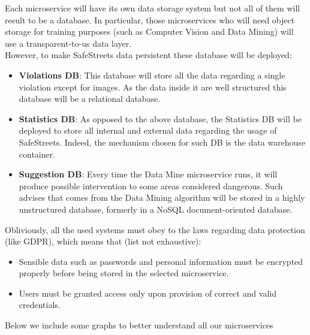 Each microservice will have its own data storage system but not all of them will result to be a database. In particular, those microservices who will need object storage for training purposes (such as Computer Vision and Data Mining) will use a transparent-to-us data layer.\\
However, to make SafeStreets data persistent these database will be deployed:
\begin{itemize}
	\item \textbf{Violations DB}: This database will store all the data regarding a single violation except for images. As the data inside it are well structured this database will be a relational database.
	\item \textbf{Statistics DB}: As opposed to the above database, the Statistics DB will be deployed to store all internal and external data regarding the usage of SafeStreets. Indeed, the mechanism chosen for such DB is the data warehouse container.
	\item \textbf{Suggestion DB}: Every time the Data Mine microservice runs, it will produce possible intervention to some areas considered dangerous. Such advises that comes from the Data Mining algorithm will be stored in a highly unstructured database, formerly in a NoSQL document-oriented database.
\end{itemize}
Obliviously, all the used systems must obey to the laws regarding data protection (like GDPR), which means that (list not exhaustive):
\begin{itemize}
\item Sensible data such as passwords and personal information must be encrypted properly before being stored in the selected microservice.
\item Users must be granted access only upon provision of correct and valid credentials.
\end{itemize}

Below we include some graphs to better understand all our microservices